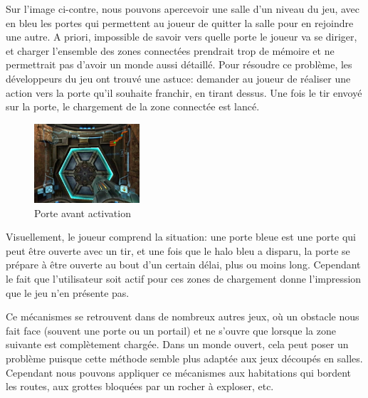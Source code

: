 \documentclass[a4paper, 11pt]{article} %
\begin{document}
Sur l'image ci-contre, nous pouvons apercevoir une salle d'un niveau du jeu, avec en bleu les portes qui permettent au joueur de quitter la salle pour en rejoindre une autre. A priori, impossible de savoir vers quelle porte le joueur va se diriger, et charger l'ensemble des zones connectées prendrait trop de mémoire et ne permettrait pas d'avoir un monde aussi détaillé. Pour résoudre ce problème, les développeurs du jeu ont trouvé une astuce: demander au joueur de réaliser une action vers la porte qu'il souhaite franchir, en tirant dessus. Une fois le tir envoyé sur la porte, le chargement de la zone connectée est lancé.

\begin{figure}
\begin{center}
\includegraphics[width=0.35\textwidth]{images/metroid-prime_door.png}
\end{center}
\caption{Porte avant activation}
\end{figure}
Visuellement, le joueur comprend la situation: une porte bleue est une porte qui peut être ouverte avec un tir, et une fois que le halo bleu a disparu, la porte se prépare à être ouverte au bout d'un certain délai, plus ou moins long. Cependant le fait que l'utilisateur soit actif pour ces zones de chargement donne l'impression que le jeu n'en présente pas.

Ce mécanismes se retrouvent dans de nombreux autres jeux, où un obstacle nous fait face (souvent une porte ou un portail) et ne s'ouvre que lorsque la zone suivante est complètement chargée.
Dans un monde ouvert, cela peut poser un problème puisque cette méthode semble plus adaptée aux jeux découpés en salles. Cependant nous pouvons appliquer ce mécanismes aux habitations qui bordent les routes, aux grottes bloquées par un rocher à exploser, etc.



\newpage



\end{document}
